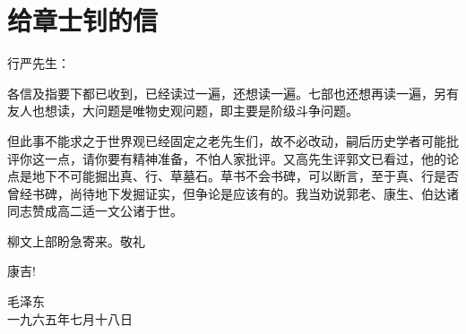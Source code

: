 \section[给章士钊的信（一九六五年七月十八日）]{给章士钊的信}


行严先生：

各信及指要下都已收到，已经读过一遍，还想读一遍。七部也还想再读一遍，另有友人也想读，大问题是唯物史观问题，即主要是阶级斗争问题。

但此事不能求之于世界观已经固定之老先生们，故不必改动，嗣后历史学者可能批评你这一点，请你要有精神准备，不怕人家批评。又高先生评郭文已看过，他的论点是地下不可能掘出真、行、草墓石。草书不会书碑，可以断言，至于真、行是否曾经书碑，尚待地下发掘证实，但争论是应该有的。我当劝说郭老、康生、伯达诸同志赞成高二适一文公诸于世。

柳文上部盼急寄来。敬礼

康吉!

{\raggedleft 毛泽东\\一九六五年七月十八日\par}


